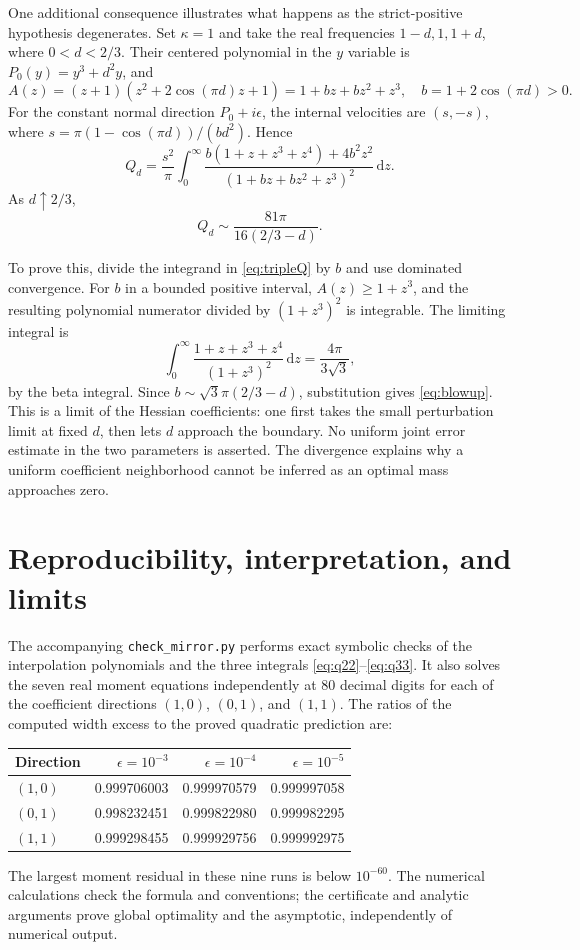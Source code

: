 \documentclass[11pt]{article}
\theoremstyle{remark}\newtheorem{remark}[theorem]{Remark}
\newcommand{\dd}{\,\mathrm d}\newcommand{\supp}{\operatorname{supp}}
\begin{document}
One additional consequence illustrates what happens as the strict-positive
hypothesis degenerates. Set $\kappa=1$ and take the real frequencies
$1-d,1,1+d$, where $0<d<2/3$. Their centered polynomial in the $y$ variable
is $P_0(y)=y^3+d^2y$, and
\[
 A(z)=(z+1)(z^2+2\cos(\pi d)z+1)
      =1+bz+bz^2+z^3,\quad b=1+2\cos(\pi d)>0.
\]
For the constant normal direction $P_0+i\epsilon$, the internal velocities
are $(s,-s)$, where
$s=\pi(1-\cos(\pi d))/(bd^2)$. Hence
\begin{equation}\label{eq:tripleQ}
 Q_d=\frac{s^2}{\pi}\int_0^\infty
 \frac{b(1+z+z^3+z^4)+4b^2z^2}{(1+bz+bz^2+z^3)^2}\dd z.
\end{equation}
As $d\uparrow2/3$,
\begin{equation}\label{eq:blowup}
 \boxed{\quad Q_d\sim\frac{81\pi}{16(2/3-d)}.\quad}
\end{equation}

To prove this, divide the integrand in \eqref{eq:tripleQ} by $b$ and use
dominated convergence. For $b$ in a bounded positive interval,
$A(z)\ge1+z^3$, and the resulting polynomial numerator divided by
$(1+z^3)^2$ is integrable. The limiting integral is
\[
 \int_0^\infty\frac{1+z+z^3+z^4}{(1+z^3)^2}\dd z
 =\frac{4\pi}{3\sqrt3},
\]
by the beta integral. Since $b\sim\sqrt3\pi(2/3-d)$, substitution gives
\eqref{eq:blowup}. This is a limit of the Hessian coefficients: one first
takes the small perturbation limit at fixed $d$, then lets $d$ approach
the boundary. No uniform joint error estimate in the two parameters is
asserted. The divergence explains why a uniform coefficient neighborhood
cannot be inferred as an optimal mass approaches zero.

\section{Reproducibility, interpretation, and limits}

The accompanying \texttt{check\_mirror.py} performs exact symbolic checks
of the interpolation polynomials and the three integrals
\eqref{eq:q22}--\eqref{eq:q33}. It also solves the seven real moment
equations independently at 80 decimal digits for each of the coefficient
directions $(1,0)$, $(0,1)$, and $(1,1)$. The ratios of the computed width
excess to the proved quadratic prediction are:
\begin{center}
\begin{tabular}{@{}lrrr@{}}\toprule
Direction & $\epsilon=10^{-3}$ & $\epsilon=10^{-4}$ & $\epsilon=10^{-5}$\\\midrule
$(1,0)$ & 0.999706003 & 0.999970579 & 0.999997058\\
$(0,1)$ & 0.998232451 & 0.999822980 & 0.999982295\\
$(1,1)$ & 0.999298455 & 0.999929756 & 0.999992975\\\bottomrule
\end{tabular}
\end{center}
The largest moment residual in these nine runs is below $10^{-60}$.
The numerical calculations check the formula and conventions; the
certificate and analytic arguments prove global optimality and the
asymptotic, independently of numerical output.
\end{document}
